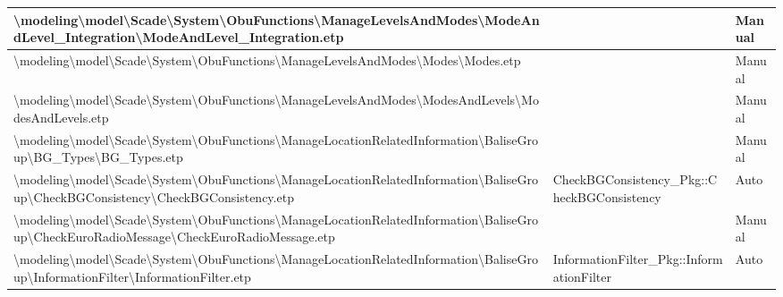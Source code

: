 \begin{longtable}{|>{\RaggedRight}p{}|>{\RaggedRight}p{}|>{\RaggedRight}p{}|}
\hline
\textbackslash \allowbreak modeling\textbackslash \allowbreak model\textbackslash \allowbreak Scade\textbackslash \allowbreak System\textbackslash \allowbreak ObuFunctions\textbackslash \allowbreak ManageLevelsAndModes\textbackslash \allowbreak ModeAndLevel\_\allowbreak Integration\textbackslash \allowbreak ModeAndLevel\_\allowbreak Integration.etp& &Manual\\
\hline
\textbackslash \allowbreak modeling\textbackslash \allowbreak model\textbackslash \allowbreak Scade\textbackslash \allowbreak System\textbackslash \allowbreak ObuFunctions\textbackslash \allowbreak ManageLevelsAndModes\textbackslash \allowbreak Modes\textbackslash \allowbreak Modes.etp& &Manual\\
\hline
\textbackslash \allowbreak modeling\textbackslash \allowbreak model\textbackslash \allowbreak Scade\textbackslash \allowbreak System\textbackslash \allowbreak ObuFunctions\textbackslash \allowbreak ManageLevelsAndModes\textbackslash \allowbreak ModesAndLevels\textbackslash \allowbreak ModesAndLevels.etp& &Manual\\
\hline
\textbackslash \allowbreak modeling\textbackslash \allowbreak model\textbackslash \allowbreak Scade\textbackslash \allowbreak System\textbackslash \allowbreak ObuFunctions\textbackslash \allowbreak ManageLocationRelatedInformation\textbackslash \allowbreak BaliseGroup\textbackslash \allowbreak BG\_\allowbreak Types\textbackslash \allowbreak BG\_\allowbreak Types.etp& &Manual\\
\hline
\textbackslash \allowbreak modeling\textbackslash \allowbreak model\textbackslash \allowbreak Scade\textbackslash \allowbreak System\textbackslash \allowbreak ObuFunctions\textbackslash \allowbreak ManageLocationRelatedInformation\textbackslash \allowbreak BaliseGroup\textbackslash \allowbreak CheckBGConsistency\textbackslash \allowbreak CheckBGConsistency.etp&CheckBGConsistency\_\allowbreak Pkg::CheckBGConsistency&Auto\\
\hline
\textbackslash \allowbreak modeling\textbackslash \allowbreak model\textbackslash \allowbreak Scade\textbackslash \allowbreak System\textbackslash \allowbreak ObuFunctions\textbackslash \allowbreak ManageLocationRelatedInformation\textbackslash \allowbreak BaliseGroup\textbackslash \allowbreak CheckEuroRadioMessage\textbackslash \allowbreak CheckEuroRadioMessage.etp& &Manual\\
\hline
\textbackslash \allowbreak modeling\textbackslash \allowbreak model\textbackslash \allowbreak Scade\textbackslash \allowbreak System\textbackslash \allowbreak ObuFunctions\textbackslash \allowbreak ManageLocationRelatedInformation\textbackslash \allowbreak BaliseGroup\textbackslash \allowbreak InformationFilter\textbackslash \allowbreak InformationFilter.etp&InformationFilter\_\allowbreak Pkg::InformationFilter&Auto\\

\end{longtable}
